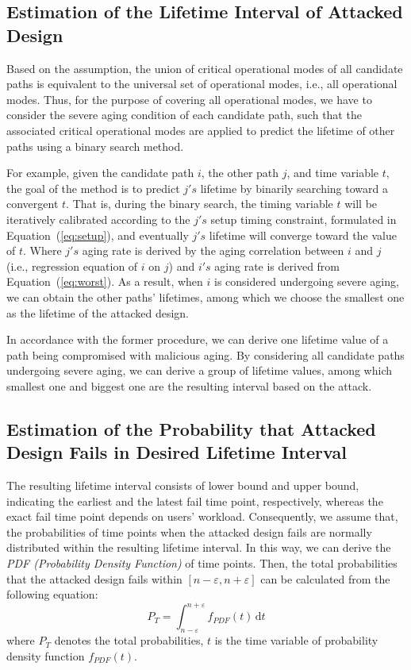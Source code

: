 \subsection{Estimation of the Lifetime Interval of Attacked Design}
Based on the assumption, the union of critical operational modes of all candidate paths is equivalent to the universal set of operational modes, i.e., all operational modes. Thus, for the purpose of covering all operational modes, we have to consider the severe aging condition of each candidate path, such that the associated critical operational modes are applied to predict the lifetime of other paths using a binary search method.

For example, given the candidate path $i$, the other path $j$, and time variable $t$, the goal of the method is to predict $j's$ lifetime by binarily searching toward a convergent $t$. That is, during the binary search, the timing variable $t$ will be iteratively calibrated according to the $j's$ setup timing constraint, formulated in Equation~(\ref{eq:setup}), and eventually $j's$ lifetime will converge toward the value of $t$. Where $j's$ aging rate is derived by the aging correlation between $i$ and $j$ (i.e., regression equation of $i$ on $j$) and $i's$ aging rate is derived from Equation~(\ref{eq:worst}). 
As a result, when $i$ is considered undergoing severe aging, we can obtain the other paths' lifetimes, among which we choose the smallest one as the lifetime of the attacked design.

In accordance with the former procedure, we can derive one lifetime value of a path being compromised with malicious aging. By considering all candidate paths undergoing severe aging, we can derive a group of lifetime values, among which smallest one and biggest one are the resulting interval based on the attack.
\subsection{Estimation of the Probability that Attacked Design Fails in Desired Lifetime Interval}
The resulting lifetime interval consists of lower bound and upper bound, indicating the earliest and the latest fail time point, respectively, whereas the exact fail time point depends on users' workload. Consequently, we assume that, the probabilities of time points when the attacked design fails are normally distributed within the resulting lifetime interval. In this way, we can derive the \textit{PDF (Probability Density Function)} of time points. Then, the total probabilities that the attacked design fails within $[n-\varepsilon, n+\varepsilon]$ can be calculated from the following equation:
\begin{equation}
	\label{eq:pdf}
		P_{T} = \int_{n-\varepsilon}^{n+\varepsilon} f_{PDF}(t) \,\mathrm{d}t
\end{equation}
where $P_{T}$ denotes the total probabilities, $t$ is the time variable of probability density function $f_{PDF}(t)$.

  
